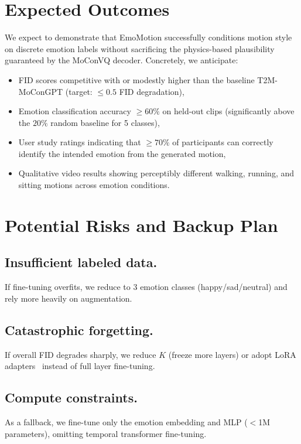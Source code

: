\documentclass[conference]{IEEEtran}
\begin{document}
\section{Expected Outcomes}
 
We expect to demonstrate that EmoMotion successfully conditions motion style on
discrete emotion labels without sacrificing the physics-based plausibility guaranteed
by the MoConVQ decoder. Concretely, we anticipate:
\begin{itemize}[noitemsep]
    \item FID scores competitive with or modestly higher than the baseline
    T2M-MoConGPT (target: $\leq 0.5$ FID degradation),
    \item Emotion classification accuracy $\geq 60\%$ on held-out clips
    (significantly above the $20\%$ random baseline for 5 classes),
    \item User study ratings indicating that $\geq 70\%$ of participants can
    correctly identify the intended emotion from the generated motion,
    \item Qualitative video results showing perceptibly different walking,
    running, and sitting motions across emotion conditions.
\end{itemize}

\section{Potential Risks and Backup Plan}

\subsection{Insufficient labeled data.} 
If fine-tuning overfits, we reduce to 3 emotion
classes (happy/sad/neutral) and rely more heavily on augmentation.

\subsection{Catastrophic forgetting.} 
If overall FID degrades sharply, we reduce $K$
(freeze more layers) or adopt LoRA adapters~\cite{hu2022lora} instead of full
layer fine-tuning.

\subsection{Compute constraints.} As a fallback, we fine-tune only the emotion embedding
and MLP ($<$1M parameters), omitting temporal transformer fine-tuning.
\end{document}
